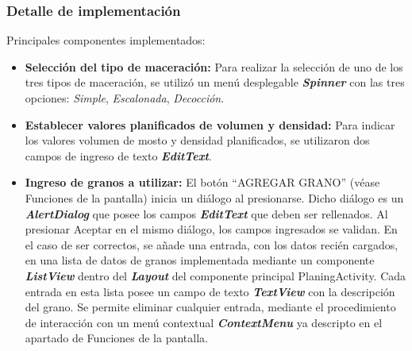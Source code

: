             \subsubsection{Detalle de implementación}
                \par Principales componentes implementados:
                \begin{itemize}
                    \item \textbf{Selección del tipo de maceración:} Para realizar la selección de uno de los tres tipos de maceración, se utilizó un menú desplegable \textbf{\textit{\gls{Spinner}}} con las tres opciones: \textit{Simple}, \textit{Escalonada}, \textit{Decocción}. 
                    
                    \item \textbf{Establecer valores planificados de volumen y densidad:} Para indicar los valores volumen de mosto y densidad planificados, se utilizaron dos campos de ingreso de texto \textbf{\textit{\gls{EditText}}}.
                    
                    \item \textbf{Ingreso de granos a utilizar:} El botón ``AGREGAR GRANO'' (véase Funciones de la pantalla) inicia un diálogo al presionarse. Dicho diálogo es un \textbf{\textit{\gls{AlertDialog}}} que posee los campos \textbf{\textit{\gls{EditText}}} que deben ser rellenados. 
                    Al presionar Aceptar en el mismo diálogo, los campos ingresados se validan. En el caso de ser correctos, se añade una entrada, con los datos recién cargados, en una lista de datos de granos implementada mediante un componente \textbf{\textit{\gls{ListView}}} dentro del \textbf{\textit{\gls{Layout}}} del componente principal PlaningActivity. Cada entrada en esta lista posee un campo de texto \textbf{\textit{\gls{TextView}}} con la descripción del grano. 
                    Se permite eliminar cualquier entrada, mediante el procedimiento de interacción con un menú contextual \textbf{\textit{\gls{ContextMenu}}} ya descripto en el apartado de Funciones de la pantalla.
                    

\end{itemize}
